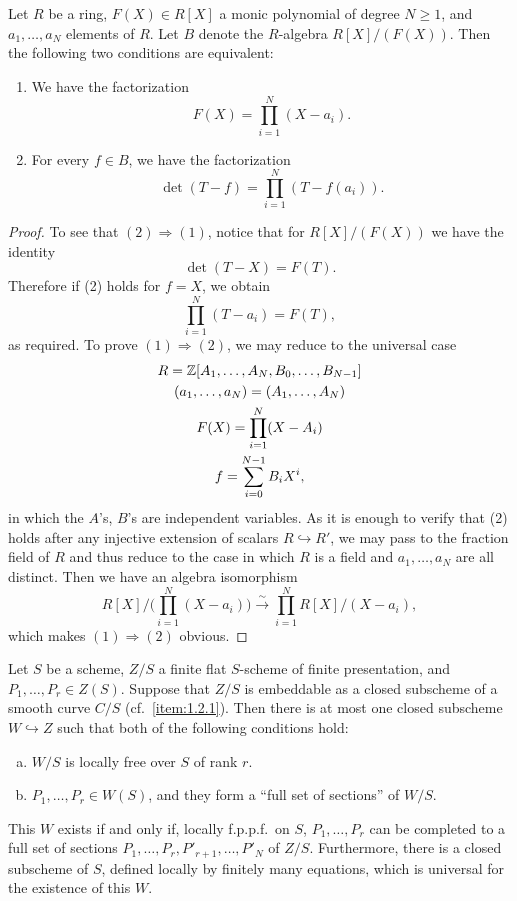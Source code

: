 \begin{lemma}\label{lem:1.10.2}
Let $R$ be a ring, $F(X) \in R[X]$ a monic polynomial of degree $N \ge 1$, and $a_1, \dots, a_N$ elements of $R$. Let $B$ denote the $R$-algebra $R[X]/(F(X))$. Then the following two conditions are equivalent:
\begin{enumerate}[(1)]
\item We have the factorization
\[
F(X) = \prod_{i=1}^N (X - a_i).
\]
\item For every $f \in B$, we have the factorization
\[
\det(T - f) = \prod_{i=1}^N (T - f(a_i)).
\]
\end{enumerate}
\end{lemma}

\begin{proof}
To see that $(2) \Longrightarrow (1)$, notice that for $R[X]/(F(X))$ we have the identity
\[
\det(T - X) = F(T).
\]
Therefore if (2) holds for $f = X$, we obtain
\[
\prod_{i=1}^N (T - a_i) = F(T),
\]
as required. To prove $(1) \Longrightarrow (2)$, we may reduce to the universal case
\begin{gather*}
R = \mathbb{Z}[A_1, \dots, A_N, B_0, \dots, B_{N-1}] \\
(a_1, \dots, a_N) = (A_1, \dots, A_N) \\
F(X) = \prod_{i=1}^N (X - A_i) \\
f = \sum_{i=0}^{N-1} B_i X^i,
\end{gather*}
in which the $A$'s, $B$'s are independent variables. As it is enough to verify that (2) holds after any injective extension of scalars $R \hookrightarrow R'$, we may pass to the fraction field of $R$ and thus reduce to the case in which $R$ is a field and $a_1, \dots, a_N$ are all distinct. Then we have an algebra isomorphism
\[
R[X]/\Biggl(\prod_{i=1}^N (X - a_i)\Biggr) \xrightarrow{\ \sim\ } \prod_{i=1}^N R[X]/(X - a_i),
\]
which makes $(1) \Longrightarrow (2)$ obvious.
\end{proof}

\begin{corollary}\label{cor:1.10.3}
Let $S$ be a scheme, $Z/S$ a finite flat $S$-scheme of finite presentation, and $P_1, \dots, P_r \in Z(S)$. Suppose that $Z/S$ is embeddable as a closed subscheme of a smooth curve $C/S$ (cf.~\ref{item:1.2.1}). Then there is at most one closed subscheme $W \hookrightarrow Z$ such that both of the following conditions hold:
\begin{enumerate}[(a)]
\item $W/S$ is locally free over $S$ of rank $r$.
\item $P_1, \dots, P_r \in W(S)$, and they form a ``full set of sections'' of $W/S$.
\end{enumerate}
This $W$ exists if and only if, locally f.p.p.f.\ on $S$, $P_1, \dots, P_r$ can be completed to a full set of sections $P_1, \dots, P_r, P'_{r+1}, \dots, P'_N$ of $Z/S$. Furthermore, there is a closed subscheme of $S$, defined locally by finitely many equations, which is universal for the existence of this $W$.
\end{corollary}

